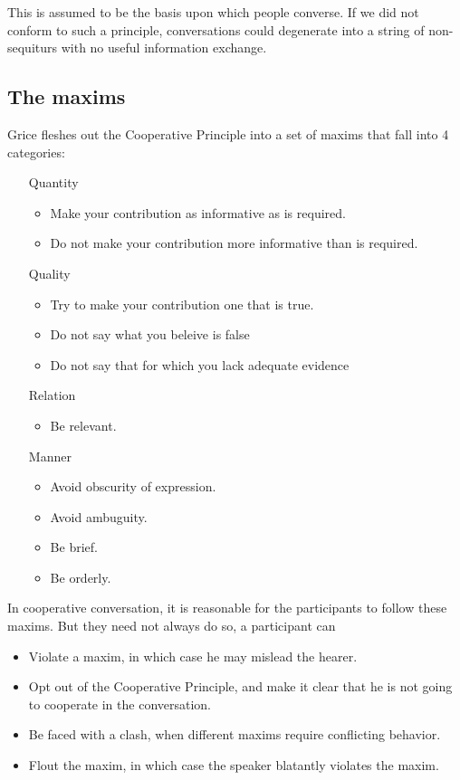 \documentclass{article}
\begin{document}
This is assumed to be the basis upon which people converse. If we did
not conform to such a principle, conversations could degenerate into a
string of non-sequiturs with no useful information exchange.

\subsection{The maxims}

Grice fleshes out the Cooperative Principle into a set of maxims that
fall into 4 categories:
\begin{itemize}
\item[Quantity]
	\begin{itemize}
	\item Make your contribution as informative as is required.
	\item Do not make your contribution more informative than is
	required. 
	\end{itemize}
\item[Quality]
	\begin{itemize}
	\item Try to make your contribution one that is true.
	\item Do not say what you beleive is false
	\item Do not say that for which you lack adequate evidence
	\end{itemize}
\item[Relation]
	\begin{itemize}
	\item Be relevant.
	\end{itemize}
\item[Manner]
	\begin{itemize}
	\item Avoid obscurity of expression.
	\item Avoid ambuguity.
	\item Be brief.
	\item Be orderly.
	\end{itemize}
\end{itemize}

In cooperative conversation, it is reasonable for the participants to
follow these maxims. But they need not always do so, a participant can
\begin{itemize}
\item Violate a maxim, in which case he may mislead the hearer.
\item Opt out of the Cooperative Principle, and make it clear that he
is not going to cooperate in the conversation.
\item Be faced with a clash, when different maxims require conflicting
behavior. 
\item Flout the maxim, in which case the speaker blatantly violates
the maxim.
\end{itemize}
\end{document}
